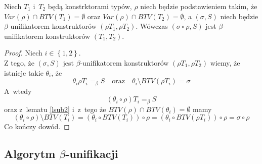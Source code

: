\documentclass[11pt,leqno]{article}
\begin{document}
\begin{lemat}
Niech $T_1$ i~$T_2$ będą konstrktorami typów, $\rho$ niech będzie podstawieniem takim, że 
$Var(\rho) \cap BTV(T_1) = \emptyset$ oraz $Var(\rho) \cap BTV(T_2) = \emptyset$, a $(\sigma, S)$ niech będzie 
$\beta$-unifikatorem konstruktorów $(\rho T_1, \rho T_2)$.
Wówczas $(\sigma \circ \rho, S)$ jest $\beta$-unifikatorem konstruktorów $(T_1, T_2)$.
\label{lunif2}
\end{lemat}
\begin{proof}
Niech $i \in \left\{1,2\right\}$.\\
Z tego, że $(\sigma, S)$ jest $\beta$-unifikatorem konstruktorów $(\rho T_1, \rho T_2)$ wiemy, że istnieje takie
$\theta_i$, że
\[
\theta_i\rho T_i =_\beta S \quad \textrm{oraz} \quad \theta_i \setminus BTV(\rho T_i) = \sigma
\]
A~wtedy
\[
(\theta_i \circ \rho) T_i =_\beta S
\]
oraz z~lematu \ref{lsub2} i~z~tego że $BTV(\rho) \cap BTV(\theta_i) = \emptyset$ mamy
\[
(\theta_i \circ \rho) \setminus BTV(T_i) = (\theta_i \circ BTV(T_i)) \circ \rho = (\theta_i \circ BTV(\rho T_i)) \circ \rho = \sigma \circ \rho
\]
Co kończy dowód.
\end{proof}

\subsection{Algorytm $\beta$-unifikacji}
\end{document}
